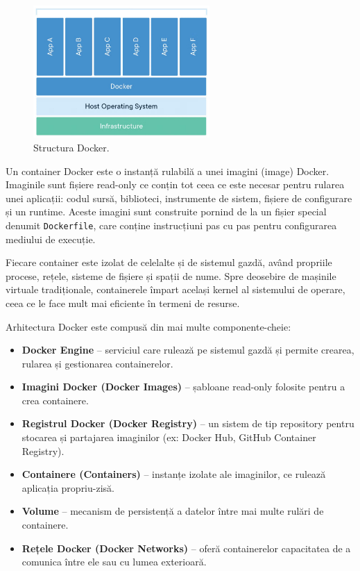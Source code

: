 \documentclass[titlepage,12pt]{article}
\begin{document}
\begin{figure}[H]
\centering
\includegraphics[width=0.6\textwidth]{images/dockerstructure}
\caption{Structura Docker.}
\label{fig:containerstructure}
\end{figure}

Un container Docker este o instanță rulabilă a unei imagini (image) Docker.
Imaginile sunt fișiere read-only ce conțin tot ceea ce este necesar pentru rularea unei aplicații: codul sursă, biblioteci, instrumente de sistem, fișiere de configurare și un runtime.
Aceste imagini sunt construite pornind de la un fișier special denumit \texttt{Dockerfile}, care conține instrucțiuni pas cu pas pentru configurarea mediului de execuție.

Fiecare container este izolat de celelalte și de sistemul gazdă, având propriile procese, rețele, sisteme de fișiere și spații de nume.
Spre deosebire de mașinile virtuale tradiționale, containerele împart același kernel al sistemului de operare, ceea ce le face mult mai eficiente în termeni de resurse.

Arhitectura Docker este compusă din mai multe componente-cheie:

\begin{itemize}
\item \textbf{Docker Engine} – serviciul care rulează pe sistemul gazdă și permite crearea, rularea și gestionarea containerelor.
\item \textbf{Imagini Docker (Docker Images)} – șabloane read-only folosite pentru a crea containere.
\item \textbf{Registrul Docker (Docker Registry)} – un sistem de tip repository pentru stocarea și partajarea imaginilor (ex: Docker Hub, GitHub Container Registry).
\item \textbf{Containere (Containers)} – instanțe izolate ale imaginilor, ce rulează aplicația propriu-zisă.
\item \textbf{Volume} – mecanism de persistență a datelor între mai multe rulări de containere.
\item \textbf{Rețele Docker (Docker Networks)} – oferă containerelor capacitatea de a comunica între ele sau cu lumea exterioară.
\end{itemize}
\end{document}
